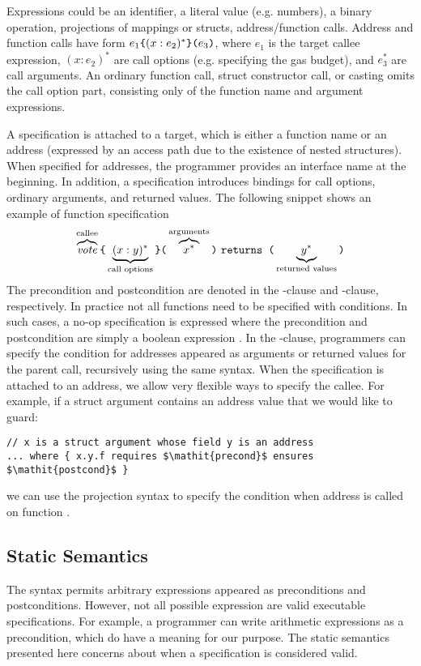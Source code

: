 Expressions could be an identifier, a literal value (e.g. numbers), a binary
operation, projections of mappings or structs, address/function calls.
Address and function calls have form ${e_1}\texttt{\{}{(x: e_2)^*}\texttt{\}(}{e_3}\texttt{)}$,
where $e_1$ is the target callee expression,
$(x: e_2)^*$ are call options (e.g. specifying the gas budget),
and $e_3^*$ are call arguments.
An ordinary function call, struct constructor call, or casting omits the call
option part, consisting only of the function name and argument expressions.

A specification is attached to a target, which is either a function name or
an address (expressed by an access path due to the existence of nested structures).
When specified for addresses, the programmer provides an interface name at the beginning.
In addition, a specification introduces bindings for call options,
ordinary arguments, and returned values. The following snippet shows an example
of function specification
\[
  \overbrace{\mathit{vote}}^{\text{callee}}\texttt{\{}\underbrace{(x : y)^*}_{\text{call options}}\texttt{\}(}\overbrace{x^*}^{\text{arguments}}\texttt{)} ~\texttt{returns (}\underbrace{y^*}_{\text{returned values}}\texttt{)}
\]
The precondition and postcondition are denoted in the -clause and
-clause, respectively.
In practice not all functions need to be specified with conditions.
In such cases, a no-op specification is expressed where the precondition and
postcondition are simply a boolean expression .
In the -clause, programmers can specify the condition for addresses
appeared as arguments or returned values for the parent call, recursively using
the same syntax.
When the specification is attached to an address, we allow very flexible ways
to specify the callee. For example, if a struct argument contains an address
value that we would like to guard:
\begin{lstlisting}
// x is a struct argument whose field y is an address
... where { x.y.f requires $\mathit{precond}$ ensures $\mathit{postcond}$ }
\end{lstlisting}
we can use the projection syntax to specify
the condition when address  is called on function .

\subsection{Static Semantics}


The syntax permits arbitrary expressions appeared as preconditions and
postconditions.
However, not all possible expression are valid executable specifications.
For example, a programmer can write arithmetic expressions  as a precondition,
which do have a meaning for our purpose.
The static semantics presented here concerns about when a specification is
considered valid.

